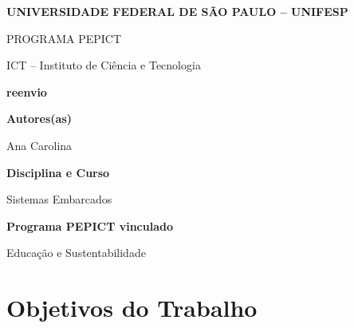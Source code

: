 \documentclass[12pt,a4paper]{article}
\begin{document}

\begin{center}

{\large \textbf{UNIVERSIDADE FEDERAL DE SÃO PAULO – UNIFESP}}

\vspace{0.3cm}

{\normalsize PROGRAMA PEPICT}

\vspace{0.3cm}

{\normalsize ICT – Instituto de Ciência e Tecnologia}

\vspace{1cm}

{\Large \textbf{reenvio}}

\end{center}

\vspace{1cm}


\noindent
\textbf{Autores(as)}

Ana Carolina

\vspace{0.7cm}


\noindent
\textbf{Disciplina e Curso}

Sistemas Embarcados

\vspace{0.7cm}


\noindent
\textbf{Programa PEPICT vinculado}

Educação e Sustentabilidade

\vspace{0.7cm}


\section*{Objetivos do Trabalho}
\end{document}

